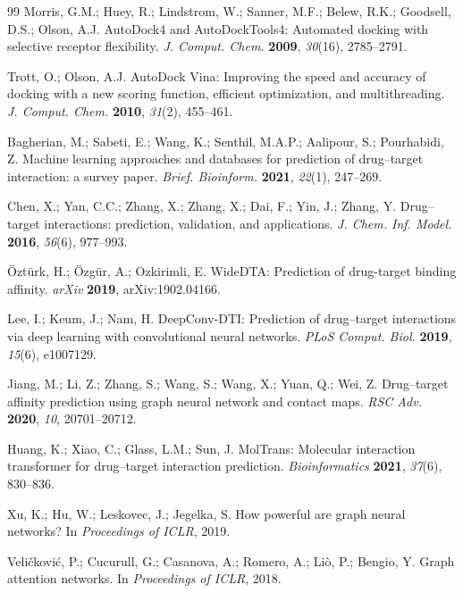 \documentclass[10pt,a4paper,twocolumn]{article}
\begin{document}
\begin{thebibliography}{99}
Morris, G.M.; Huey, R.; Lindstrom, W.; Sanner, M.F.; Belew, R.K.; Goodsell, D.S.; Olson, A.J. AutoDock4 and AutoDockTools4: Automated docking with selective receptor flexibility. \textit{J. Comput. Chem.} \textbf{2009}, \textit{30}(16), 2785--2791.


Trott, O.; Olson, A.J. AutoDock Vina: Improving the speed and accuracy of docking with a new scoring function, efficient optimization, and multithreading. \textit{J. Comput. Chem.} \textbf{2010}, \textit{31}(2), 455--461.


Bagherian, M.; Sabeti, E.; Wang, K.; Senthil, M.A.P.; Aalipour, S.; Pourhabidi, Z. Machine learning approaches and databases for prediction of drug--target interaction: a survey paper. \textit{Brief. Bioinform.} \textbf{2021}, \textit{22}(1), 247--269.


Chen, X.; Yan, C.C.; Zhang, X.; Zhang, X.; Dai, F.; Yin, J.; Zhang, Y. Drug--target interactions: prediction, validation, and applications. \textit{J. Chem. Inf. Model.} \textbf{2016}, \textit{56}(6), 977--993.


Öztürk, H.; Özgür, A.; Ozkirimli, E. WideDTA: Prediction of drug-target binding affinity. \textit{arXiv} \textbf{2019}, arXiv:1902.04166.


Lee, I.; Keum, J.; Nam, H. DeepConv-DTI: Prediction of drug--target interactions via deep learning with convolutional neural networks. \textit{PLoS Comput. Biol.} \textbf{2019}, \textit{15}(6), e1007129.


Jiang, M.; Li, Z.; Zhang, S.; Wang, S.; Wang, X.; Yuan, Q.; Wei, Z. Drug--target affinity prediction using graph neural network and contact maps. \textit{RSC Adv.} \textbf{2020}, \textit{10}, 20701--20712.


Huang, K.; Xiao, C.; Glass, L.M.; Sun, J. MolTrans: Molecular interaction transformer for drug--target interaction prediction. \textit{Bioinformatics} \textbf{2021}, \textit{37}(6), 830--836.


Xu, K.; Hu, W.; Leskovec, J.; Jegelka, S. How powerful are graph neural networks? In \textit{Proceedings of ICLR}, 2019.


Veličković, P.; Cucurull, G.; Casanova, A.; Romero, A.; Liò, P.; Bengio, Y. Graph attention networks. In \textit{Proceedings of ICLR}, 2018.



\end{thebibliography}
\end{document}
